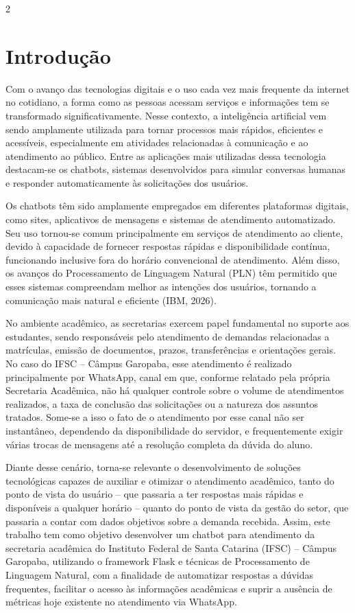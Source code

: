 \documentclass[10pt]{article}
\begin{document}
\begin{multicols}{2}

\section{Introdução}

Com o avanço das tecnologias digitais e o uso cada vez mais frequente da
internet no cotidiano, a forma como as pessoas acessam serviços e
informações tem se transformado significativamente. Nesse contexto, a
inteligência artificial vem sendo amplamente utilizada para tornar
processos mais rápidos, eficientes e acessíveis, especialmente em
atividades relacionadas à comunicação e ao atendimento ao público. Entre
as aplicações mais utilizadas dessa tecnologia destacam-se os chatbots,
sistemas desenvolvidos para simular conversas humanas e responder
automaticamente às solicitações dos usuários.

Os chatbots têm sido amplamente empregados em diferentes plataformas
digitais, como sites, aplicativos de mensagens e sistemas de atendimento
automatizado. Seu uso tornou-se comum principalmente em serviços de
atendimento ao cliente, devido à capacidade de fornecer respostas rápidas
e disponibilidade contínua, funcionando inclusive fora do horário
convencional de atendimento. Além disso, os avanços do Processamento de
Linguagem Natural (PLN) têm permitido que esses sistemas compreendam
melhor as intenções dos usuários, tornando a comunicação mais natural e
eficiente (IBM, 2026).

No ambiente acadêmico, as secretarias exercem papel fundamental no
suporte aos estudantes, sendo responsáveis pelo atendimento de demandas
relacionadas a matrículas, emissão de documentos, prazos, transferências
e orientações gerais. No caso do IFSC -- Câmpus Garopaba, esse
atendimento é realizado principalmente por WhatsApp, canal em que,
conforme relatado pela própria Secretaria Acadêmica, não há qualquer
controle sobre o volume de atendimentos realizados, a taxa de conclusão
das solicitações ou a natureza dos assuntos tratados. Some-se a isso o
fato de o atendimento por esse canal não ser instantâneo, dependendo da
disponibilidade do servidor, e frequentemente exigir várias trocas de
mensagens até a resolução completa da dúvida do aluno.

Diante desse cenário, torna-se relevante o desenvolvimento de soluções
tecnológicas capazes de auxiliar e otimizar o atendimento acadêmico,
tanto do ponto de vista do usuário -- que passaria a ter respostas mais
rápidas e disponíveis a qualquer horário -- quanto do ponto de vista da
gestão do setor, que passaria a contar com dados objetivos sobre a
demanda recebida. Assim, este trabalho tem como objetivo desenvolver um
chatbot para atendimento da secretaria acadêmica do Instituto Federal de
Santa Catarina (IFSC) -- Câmpus Garopaba, utilizando o framework Flask e
técnicas de Processamento de Linguagem Natural, com a finalidade de
automatizar respostas a dúvidas frequentes, facilitar o acesso às
informações acadêmicas e suprir a ausência de métricas hoje existente no
atendimento via WhatsApp.


\end{multicols}
\end{document}
